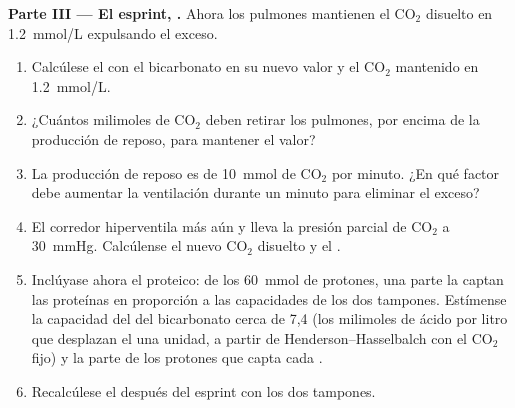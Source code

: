 \begin{problem}
\medskip
\noindent\textbf{Parte III --- El esprint, .}
Ahora los pulmones mantienen el $\mathrm{CO_2}$ disuelto en
\qty{1.2}{mmol/L} expulsando el exceso.
\begin{enumerate}[resume]
  \item Calcúlese el  con el bicarbonato en su nuevo valor y el
        $\mathrm{CO_2}$ mantenido en \qty{1.2}{mmol/L}.
  \item ¿Cuántos milimoles de $\mathrm{CO_2}$ deben retirar los pulmones,
        por encima de la producción de reposo, para mantener el valor?
  \item La producción de reposo es de \qty{10}{mmol} de $\mathrm{CO_2}$ por
        minuto. ¿En qué factor debe aumentar la ventilación durante un
        minuto para eliminar el exceso?
  \item El corredor hiperventila más aún y lleva la presión parcial de
        $\mathrm{CO_2}$ a \qty{30}{mmHg}. Calcúlense el nuevo
        $\mathrm{CO_2}$ disuelto y el .
  \item Inclúyase ahora el  proteico: de los \qty{60}{mmol} de
        protones, una parte la captan las proteínas en proporción a las
        capacidades de los dos tampones. Estímense la capacidad del
         del bicarbonato cerca de  7,4 (los milimoles de
        ácido por litro que desplazan el  una unidad, a partir de
        Henderson--Hasselbalch con el $\mathrm{CO_2}$ fijo) y la parte de
        los protones que capta cada .
  \item Recalcúlese el  después del esprint con los dos tampones.
\end{enumerate}


\end{problem}

